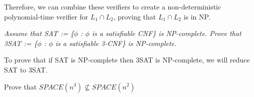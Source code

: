 \documentclass{cis320}
\begin{document}
Therefore, we can combine these verifiers to create a non-deterministic polynomial-time verifier for \( L_1 \cap L_2\), proving that \( L_1 \cap L_2\) is in NP.



\HWproblem
\textit{Assume that SAT := \{$\phi$  : $\phi$ is a satisfiable CNF\} is NP-complete. Prove that 3SAT := \{$\phi$ : $\phi$  is a satisfiable 3-CNF\} is NP-complete.}

To prove that if SAT is NP-complete then 3SAT is NP-complete, we will reduce SAT to 3SAT.









\HWproblem
Prove that \( SPACE(n^3) \not\subseteq SPACE(n^2) \)
\end{document}
